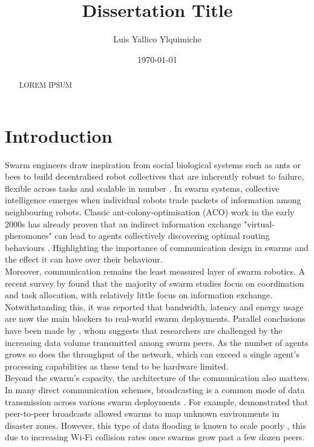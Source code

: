 \documentclass[conference]{IEEEtran}
\title{Dissertation Title}
\author{Luis Yallico Ylquimiche}
\date{\today}
\begin{document}
\maketitle

\begin{abstract}
LOREM IPSUM
\end{abstract}


\section{Introduction}

Swarm engineers draw inspiration from social biological systems such as ants or bees to build decentralised robot collectives that are inherently robust to failure, flexible across tasks and scalable in number \cite{dias_swarm_2021}. In swarm systems, collective intelligence emerges when individual robots trade packets of information among neighbouring robots. Classic ant-colony-optimisation (ACO) work in the early 2000s has already proven that an indirect information exchange "virtual-pheromones" can lead to agents collectively discovering optimal routing behaviours \cite{dorigo_ant_2000}. Highlighting the importance of communication design in swarms and the effect it can have over their behaviour.\\

Moreover, communication remains the least measured layer of swarm robotics. A recent survey by \cite{an_multi-robot_2023} found that the majority of swarm studies focus on coordination and task allocation, with relatively little focus on information exchange. Notwithstanding this, it was reported that bandwidth, latency and energy usage are now the main blockers to real-world swarm deployments. Parallel conclusions have been made by \cite{ding_advancements_2023}, whom suggests that researchers are challenged by the increasing data volume transmitted among swarm peers. As the number of agents grows so does the throughput of the network, which can exceed a single agent's processing capabilities as these tend to be hardware limited.\\

Beyond the swarm's capacity, the architecture of the communication also matters. In many direct communication schemes, broadcasting is a common mode of data transmission across various swarm deployments \cite{an_multi-robot_2023}. For example,\cite{perrin_decentralised_2012} demonstrated that peer-to-peer broadcasts allowed swarms to map unknown environments in disaster zones. However, this type of data flooding is known to scale poorly \cite{an_multi-robot_2023}, this due to increasing Wi-Fi collision rates once swarms grow past a few dozen peers.\\ 
\end{document}
